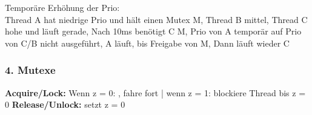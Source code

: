 Temporäre Erhöhung der Prio: \\
Thread A hat niedrige Prio und
hält einen Mutex M, Thread B mittel, Thread C hohe und läuft
gerade, Nach 10ms benötigt C M, Prio von A temporär auf
Prio von C/B nicht ausgeführt, A läuft, bis Freigabe von M, Dann läuft wieder C

\subsubsection{4. Mutexe}
\textbf{Acquire/Lock:} Wenn z = 0: , fahre fort |
wenn z = 1: blockiere Thread bis z = 0
\textbf{Release/Unlock:} setzt z = 0





